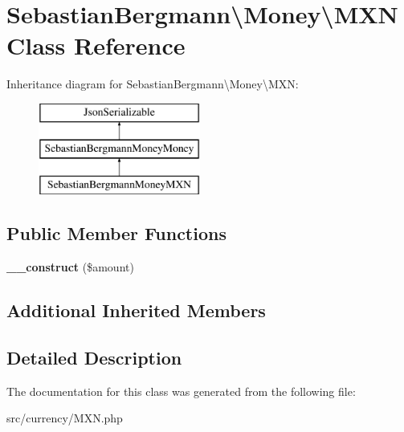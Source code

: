 \hypertarget{classSebastianBergmann_1_1Money_1_1MXN}{}\section{Sebastian\+Bergmann\textbackslash{}Money\textbackslash{}M\+X\+N Class Reference}
\label{classSebastianBergmann_1_1Money_1_1MXN}
Inheritance diagram for Sebastian\+Bergmann\textbackslash{}Money\textbackslash{}M\+X\+N\+:\begin{figure}[H]
\begin{center}
\leavevmode
\includegraphics[height=3.000000cm]{classSebastianBergmann_1_1Money_1_1MXN}
\end{center}
\end{figure}
\subsection*{Public Member Functions}
\begin{DoxyCompactItemize}
\item 
\hypertarget{classSebastianBergmann_1_1Money_1_1MXN_a3d7f16737b2cfe3509a88dccebcea96d}{}{\bfseries \+\_\+\+\_\+construct} (\$amount)\label{classSebastianBergmann_1_1Money_1_1MXN_a3d7f16737b2cfe3509a88dccebcea96d}

\end{DoxyCompactItemize}
\subsection*{Additional Inherited Members}


\subsection{Detailed Description}


The documentation for this class was generated from the following file\+:\begin{DoxyCompactItemize}
\item 
src/currency/M\+X\+N.\+php\end{DoxyCompactItemize}
